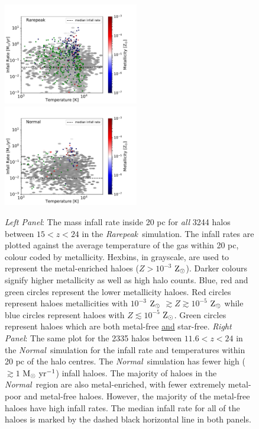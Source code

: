 \documentclass[graphics, twocolumn, usenatbib]{mn2e}
\newcommand{\msolaryrc} {$\rm{M_{\odot}~yr^{-1}}$}
\newcommand{\zsolar} {$\rm{Z_{\odot}}~$}
\newcommand{\zsolarc} {$\rm{Z_{\odot}}$}
\newcommand{\rarepeak} {\textit{Rarepeak~}}
\newcommand{\normal} {\textit{Normal~}}
\begin{document}
\begin{figure}
\centering
\begin{minipage}{175mm}      \begin{center} 
\centerline{
\includegraphics[width=0.525\textwidth]{FIGURES/Rarepeak_MdotTZ.pdf}
\includegraphics[width=0.525\textwidth]{FIGURES/Normal_MdotTZ.pdf}}
\caption{\textit{Left Panel}: The mass infall rate inside 20 pc for \textit{all} 
  3244 halos between $15<z<24$ in 
  the \rarepeak simulation. The infall rates are plotted
  against the average temperature of the gas within 20 pc, colour coded by metallicity. Hexbins, in
  grayscale, are used to represent the metal-enriched haloes ($Z > 10^{-3}$ \zsolarc).
  Darker colours signify higher metallicity as well as high halo counts. Blue, red and green circles
  represent the lower metallicity haloes. Red circles represent haloes metallicities
  with $10^{-3} $ \zsolar $\gtrsim Z \gtrsim 10^{-5}$ \zsolar while blue circles represent
  haloes with $Z \lesssim 10^{-5}$ \zsolarc. Green circles represent haloes which are both
  metal-free \underline{and} star-free.  \textit{Right Panel}: The same plot for the 2335 halos between $11.6<z<24$ in the \normal simulation
  for the infall rate and temperatures within 20 pc of the halo centres.
  The \normal simulation has fewer high ($ \gtrsim 1 $ \msolaryrc) infall haloes.  The majority of haloes in the \normal region are also metal-enriched, with fewer extremely metal-poor and
  metal-free haloes. However, the majority of the metal-free haloes have high infall rates. 
  The median infall rate for all of the haloes is marked by the dashed 
  black horizontal line in both panels.}
  \label{Fig:Scatter}
\end{center} \end{minipage}

\end{figure}
\end{document}

